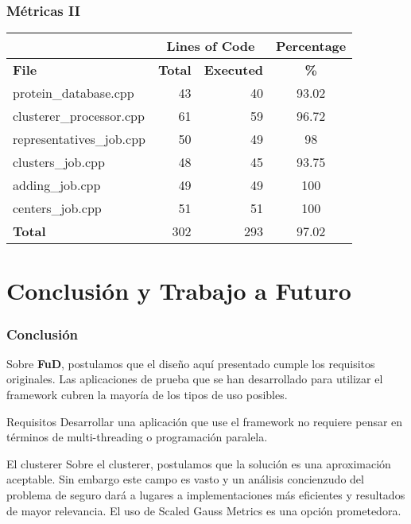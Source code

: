 \documentclass[xcolor=pdftex,dvipsnames,table,10pt,babel,spanish]{beamer}
\begin{document}
\begin{frame}
 \frametitle{M\'etricas II}
 

\begin{center}
\begin{tabular}{|l|r|r|c|}
\hline
 & \multicolumn{2}{|c|}{Lines of Code} & Percentage \\
\hline
\textbf{File} & \textbf{Total} & \textbf{Executed} & \textbf{\%} \\
\hline
\scriptsize{protein\_database.cpp} & 43 & 40 & 93.02 \\
\hline 
\scriptsize{clusterer\_processor.cpp} & 61 & 59 & 96.72 \\
\hline 
\scriptsize{representatives\_job.cpp} & 50 & 49 & 98 \\
\hline 
\scriptsize{clusters\_job.cpp} & 48 & 45 & 93.75 \\
\hline 
\scriptsize{adding\_job.cpp} & 49 & 49 & 100 \\
\hline 
\scriptsize{centers\_job.cpp} & 51 & 51 & 100 \\
\hline 
\textbf{Total} & 302 & 293 & 97.02 \\
\hline
\end{tabular}
\end{center}

\end{frame}

\section{Conclusi\'on y Trabajo a Futuro}

\begin{frame}
 \frametitle{Conclusi\'on}
 
\begin{block}{}
Sobre \textbf{FuD}, postulamos que el dise\~no aqu\'i presentado cumple los requisitos originales. Las aplicaciones de prueba que se han desarrollado para utilizar el framework cubren la mayor\'ia de los tipos de uso posibles.
\end{block}

\pause

\begin{block}{Requisitos}
Desarrollar una aplicaci\'on que use el framework no requiere pensar en t\'erminos de multi-threading o programaci\'on paralela.
\end{block}

\pause
\begin{block}{El clusterer}
Sobre el clusterer, postulamos que la soluci\'on es una aproximaci\'on aceptable. Sin embargo este campo es vasto y un an\'alisis concienzudo del problema de seguro dar\'a a lugares a implementaciones m\'as eficientes y resultados de mayor relevancia. El uso de Scaled Gauss Metrics es una opci\'on prometedora.
\end{block}

\end{frame}
\end{document}
